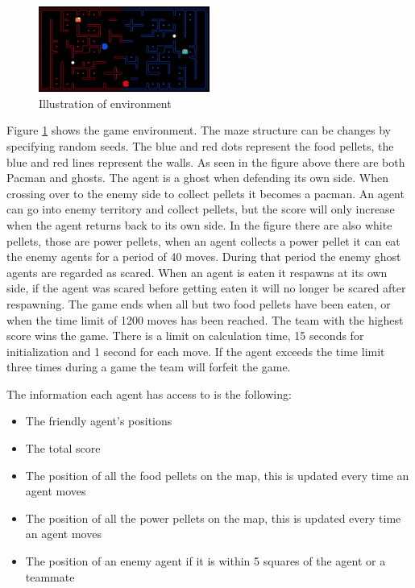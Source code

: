 \documentclass[a4paper,12pt]{article}
\begin{document}
\begin{figure}[!htbp]
  \centering
  \includegraphics[width=0.5\textwidth]{./figuresA4/pacman_illustration.png}
  \caption{Illustration of environment}
  \label{fig:drag_force}
\end{figure}

Figure \ref{fig:drag_force} shows the game environment. The maze structure can be changes by specifying random seeds. The blue and red dots represent the food pellets, the blue and red lines represent the walls. 
As seen in the figure above there are both Pacman and ghosts. The agent is a ghost when defending its own side. When crossing over to the enemy side to collect pellets it becomes a pacman.
An agent can go into enemy territory and collect pellets, but the score will only increase when the agent returns back to its own side. In the figure there are also white pellets, 
those are power pellets, when an agent collects a power pellet it can eat the enemy agents for a period of 40 moves. During that period the enemy ghost agents are regarded as scared.
When an agent is eaten it respawns at its own side, if the agent was scared before getting eaten it will no longer be scared after respawning.
The game ends when all but two food pellets have been eaten, or when the time limit of 1200 moves has been reached. The team with the highest score wins the game.
There is a limit on calculation time, 15 seconds for initialization and 1 second for each move. If the agent exceeds the time limit three times during a game the team will forfeit the game.

The information each agent has access to is the following:
\begin{itemize}
  \item The friendly agent's positions
  \item The total score
  \item The position of all the food pellets on the map, this is updated every time an agent moves
  \item The position of all the power pellets on the map, this is updated every time an agent moves
  \item The position of an enemy agent if it is within 5 squares of the agent or a teammate 
\end{itemize}
\end{document}
